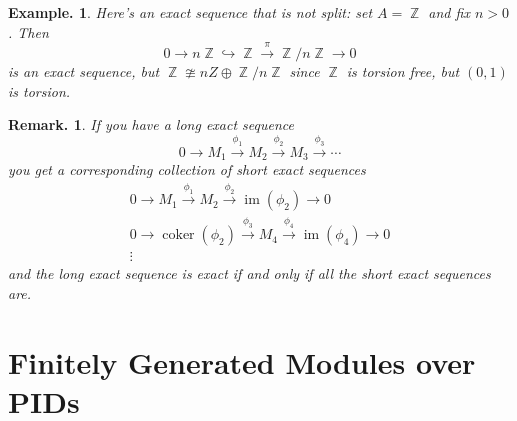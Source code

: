 \documentclass[11pt, a4paper]{memoir}
\DeclareMathOperator{\Z}{{\mathbb{Z}}}
\newcommand{\fto}[1]{\ensuremath{\xrightarrow{\scriptstyle{#1}}}}
\newcommand{\hto}[0]{\ensuremath{\hookrightarrow}}
\theoremstyle{change}
\theoremstyle{plain}
\theoremstyle{nonumberplain}
\newtheorem{example}{Example.}
\newtheorem{remark}{Remark.}
\DeclareMathOperator{\coker}{coker}
\DeclareMathOperator{\im}{im}
\numberwithin{equation}{section}
\begin{document}
\begin{example}
    Here's an exact sequence that is not split: set $A=\Z$ and fix $n>0$.
    Then
    \begin{equation*}
        0\to n\Z\hto\Z\fto{\pi}\Z/n\Z\to 0
    \end{equation*}
    is an exact sequence, but $\Z\ncong nZ\oplus \Z/n\Z$ since $\Z$ is torsion free, but $(0,1)$ is torsion.
\end{example}
\begin{remark}
    If you have a long exact sequence
    \begin{equation*}
        0\to M_1\fto{\phi_1}M_2\fto{\phi_2} M_3\fto{\phi_3}\cdots
    \end{equation*}
    you get a corresponding collection of short exact sequences
    \begin{gather*}
        0\to M_1\fto{\phi_1}M_2\fto{\phi_2} \im(\phi_2)\to 0\\
        0\to\coker(\phi_2)\fto{\phi_3}M_4\fto{\phi_4}\im(\phi_4)\to 0\\
        \vdots
    \end{gather*}
    and the long exact sequence is exact if and only if all the short exact sequences are.
\end{remark}
\chapter{Finitely Generated Modules over PIDs}
\end{document}
